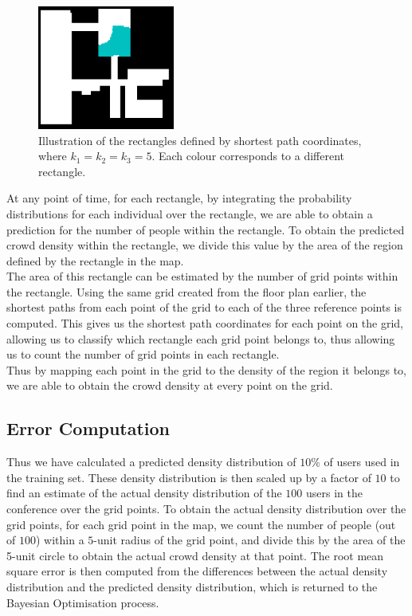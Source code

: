 \documentclass[letterpaper]{article}
\begin{document}
\begin{figure}[!h]
  \centering
    \includegraphics[width=170px]{diagrams/spsinglerectangle.png}
  \caption{Illustration of the rectangles defined by shortest path coordinates, where $k_1 = k_2 = k_3 = 5$. Each colour corresponds to a different rectangle.}
  \label{fig:sprectangles}
\end{figure}


At any point of time, for each rectangle, by integrating the probability distributions for each individual over the rectangle, we are able to obtain a prediction for the number of people within the rectangle. To obtain the predicted crowd density within the rectangle, we divide this value by the area of the region defined by the rectangle in the map.\\

The area of this rectangle can be estimated by the number of grid points within the rectangle. Using the same grid created from the floor plan earlier, the shortest paths from each point of the grid to each of the three reference points is computed. This gives us the shortest path coordinates for each point on the grid, allowing us to classify which rectangle each grid point belongs to, thus allowing us to count the number of grid points in each rectangle. \\

Thus by mapping each point in the grid to the density of the region it belongs to, we are able to obtain the crowd density at every point on the grid.

\subsection{Error Computation}

Thus we have calculated a predicted density distribution of $10\%$ of users used in the training set. These density distribution is then scaled up by a factor of $10$ to find an estimate of the actual density distribution of the $100$ users in the conference over the grid points. To obtain the actual density distribution over the grid points, for each grid point in the map, we count the number of people (out of $100$) within a $5$-unit radius of the grid point, and divide this by the area of the 5-unit circle to obtain the actual crowd density at that point. The root mean square error is then computed from the differences between the actual density distribution and the predicted density distribution, which is returned to the Bayesian Optimisation process. \\
\end{document}
